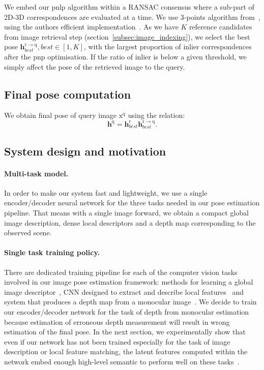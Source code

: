 We embed our \ac{pnlp} algorithm within a RANSAC consensus where a sub-part of 2D-3D correspondences are evaluated at a time. We use 3-points algorithm from~\citep{Kneip2011}, using the authors efficient implementation~\citep{Kneip2014opengv}. As we have $K$ reference candidates from image retrieval step (section~\ref{subsec:image_indexing}), we select the best pose $\mathbf{h}^\mathrm{r \rightarrow q}_{best}, best\in\left[1,K\right]$, with the largest proportion of inlier correspondences after the \ac{pnp} optimisation. If the ratio of inlier is below a given threshold, we simply affect the pose of the retrieved image to the query.

\subsection{Final pose computation}
We obtain final pose of query image $\mathrm{x^q}$ using the relation:
\begin{equation}
	\mathbf{h}^\mathrm{q} = \mathbf{h}^\mathrm{r}_{best}\mathbf{h}^\mathrm{r \rightarrow q}_{best}.
\end{equation}

\subsection{System design and motivation}
\paragraph{Multi-task model.} In order to make our system fast and lightweight, we use a single encoder/decoder neural network for the three tasks needed in our pose estimation pipeline. That means with a single image forward, we obtain a compact global image description, dense local descriptors and a depth map corresponding to the observed scene.
\paragraph{Single task training policy.} There are dedicated training pipeline for each of the computer vision tasks involved in our image pose estimation framework: methods for learning a global image descriptor~\citep{Arandjelovic2017, Radenovic2017, Gordo2017}, CNN designed to extract and describe local features~\citep{Yi2016a, Rocco2018, Ono2018} and system that produces a depth map from a monocular image~\citep{Eigen2014, Godard2017, Mahjourian2018}. We decide to train our encoder/decoder network for the task of depth from monocular estimation because estimation of erroneous depth measurement will result in wrong estimation of the final pose. In the next section, we experimentally show that even if our network has not been trained especially for the task of image description or local feature matching, the latent features computed within the network embed enough high-level semantic to perform well on these tasks~\citep{Taira2018, Zamir2018}.
